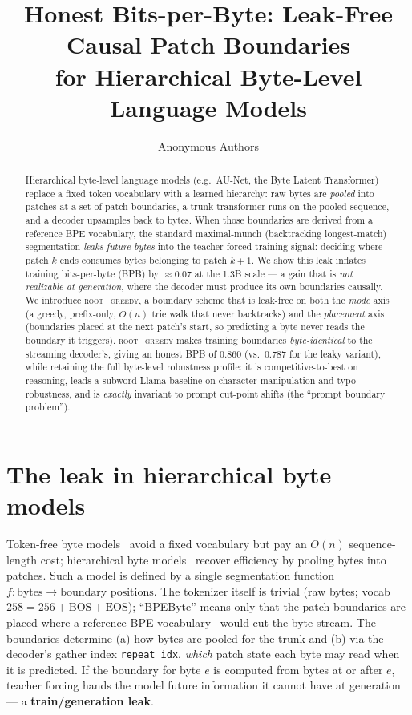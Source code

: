 \documentclass{article} %
\title{Honest Bits-per-Byte: Leak-Free Causal Patch Boundaries\\ for Hierarchical Byte-Level Language Models}
\author{Anonymous Authors}
\newcommand{\rg}{\textsc{root\_greedy}}
\begin{document}
\maketitle

\begin{abstract}
Hierarchical byte-level language models (e.g.\ AU-Net, the Byte Latent Transformer) replace a
fixed token vocabulary with a learned hierarchy: raw bytes are \emph{pooled} into patches at a set
of patch boundaries, a trunk transformer runs on the pooled sequence, and a decoder upsamples back
to bytes. When those boundaries are derived from a reference BPE vocabulary, the standard
maximal-munch (backtracking longest-match) segmentation \emph{leaks future bytes} into the
teacher-forced training signal: deciding where patch $k$ ends consumes bytes belonging to patch
$k{+}1$. We show this leak inflates training bits-per-byte (BPB) by $\approx0.07$ at the 1.3B scale
--- a gain that is \emph{not realizable at generation}, where the decoder must produce its own
boundaries causally. We introduce \rg{}, a boundary scheme that is leak-free on both the
\emph{mode} axis (a greedy, prefix-only, $O(n)$ trie walk that never backtracks) and the
\emph{placement} axis (boundaries placed at the next patch's start, so predicting a byte never reads
the boundary it triggers). \rg{} makes training boundaries \emph{byte-identical} to the streaming
decoder's, giving an honest BPB of $0.860$ (vs.\ $0.787$ for the leaky variant), while retaining the
full byte-level robustness profile: it is competitive-to-best on reasoning, leads a subword Llama
baseline on character manipulation and typo robustness, and is \emph{exactly} invariant to prompt
cut-point shifts (the ``prompt boundary problem'').
\end{abstract}

\section{The leak in hierarchical byte models}
\vspace{-2pt}
Token-free byte models~\citep{xue2022byt5, slagle2024spacebyte} avoid a fixed vocabulary but pay an
$O(n)$ sequence-length cost; hierarchical byte
models~\citep{nawrot2023hourglass, yu2023megabyte, pagnoni2024blt, pagnoni2025aunet} recover
efficiency by pooling bytes into patches. Such a model is defined by a single segmentation function
$f:\text{bytes}\!\to\!\text{boundary positions}$. The tokenizer itself is trivial (raw bytes; vocab
$258 = 256 + \text{BOS} + \text{EOS}$); ``BPEByte'' means only that the patch boundaries are placed
where a reference BPE vocabulary~\citep{grattafiori2024llama3} would cut the byte stream. The boundaries determine (a) how bytes are pooled for the trunk and (b) via the
decoder's gather index \texttt{repeat\_idx}, \emph{which} patch state each byte may read when it is
predicted. If the boundary for byte $e$ is computed from bytes at or after $e$, teacher forcing hands
the model future information it cannot have at generation --- a \textbf{train/generation leak}.
\end{document}
